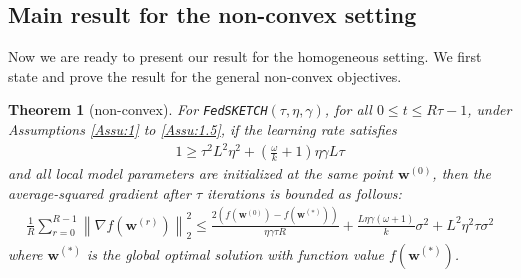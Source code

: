 \documentclass[twoside]{article}
\newtheorem{theorem}{Theorem}
\begin{document}
\subsection{Main result for the non-convex setting}
Now we are ready to present our result for the homogeneous setting. We first state and prove the result for the general non-convex objectives.  
\begin{theorem}[non-convex]\label{thm:lsgwd-lr} For \texttt{FedSKETCH}$(\tau, \eta, \gamma)$, for all $0\leq t\leq R\tau-1$,  under Assumptions \ref{Assu:1} to \ref{Assu:1.5}, if the learning rate satisfies \begin{align}
   1\geq {\tau^2 L^2\eta^2}+\left(\frac{\omega}{k}+1\right){\eta\gamma L}{\tau}
\label{eq:cnd-thm4.3}
\end{align}
and all local model parameters are initialized at the same point ${\boldsymbol{w}}^{(0)}$, then the average-squared gradient after $\tau$ iterations is bounded as follows:
\begin{align}
        \frac{1}{R}\sum_{r=0}^{R-1}\left\|\nabla f({\boldsymbol{w}}^{(r)})\right\|_2^2\leq \frac{2\left(f(\boldsymbol{w}^{(0)})-f(\boldsymbol{w}^{(*)})\right)}{\eta\gamma\tau R}+\frac{L\eta\gamma{\left(\omega+1\right)}}{k}\sigma^2+{L^2\eta^2\tau }\sigma^2\label{eq:thm1-result} 
\end{align}
where $\boldsymbol{w}^{(*)}$ is the global optimal solution with  function value $f(\boldsymbol{w}^{(*)})$.
\end{theorem}
\end{document}
